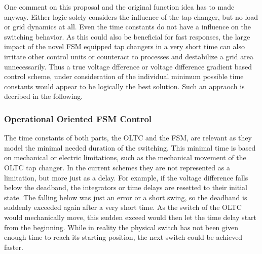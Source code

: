 One comment on this proposal and the original function idea has to made anyway.
Either logic solely considers the influence of the tap changer, but no load or grid dynamics at all.
Even the time constants do not have a influence on the switching behavior.
As this could also be beneficial for fast responses, the large impact of the novel \acs{FSM} equipped tap changers in a very short time can also irritate other control units or counteract to processes and destabilize a grid area unnecessarily.
Thus a true voltage dfference or voltage difference gradient based control scheme, under consideration of the individual minimum possible time constants would appear to be logically the best solution.
Such an appraoch is decribed in the following.

\subsubsection{Operational Oriented FSM Control}
\label{sec:modeling-op-control}

The time constants of both parts, the \acs{OLTC} and the \acs{FSM}, are relevant as they model the minimal needed duration of the switching.
This minimal time is based on mechanical or electric limitations, such as the mechanical movement of the \acs{OLTC} tap changer.
In the current schemes they are not represented as a limitation, but more just as a delay.
For example, if the voltage difference falls below the deadband, the integrators or time delays are resetted to their initial state. 
The falling below was just an error or a short swing, so the deadband is suddenly exceeded again after a very short time.
As the switch of the \acs{OLTC} would mechanically move, this sudden exceed would then let the time delay start from the beginning.
While in reality the physical switch has not been given enough time to reach its starting position, the next switch could be achieved faster. 

